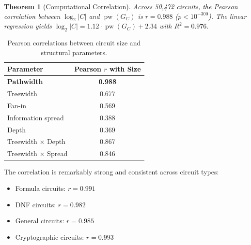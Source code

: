 \documentclass[11pt]{article}
\theoremstyle{plain}
\newtheorem{theorem}{Theorem}[section]
\theoremstyle{definition}
\newcommand{\pw}{\operatorname{pw}}
\begin{document}
\begin{theorem}[Computational Correlation]\label{thm:correlation}
Across 50{,}472 circuits, the Pearson correlation between $\log_2 |C|$ and $\pw(G_C)$ is $r = 0.988$ ($p < 10^{-300}$). The linear regression yields $\log_2 |C| = 1.12 \cdot \pw(G_C) + 2.34$ with $R^2 = 0.976$.
\end{theorem}

\begin{table}[htbp]
\centering
\caption{Pearson correlations between circuit size and structural parameters.}
\label{tab:correlations}
\begin{tabular}{@{}lc@{}}
\toprule
\textbf{Parameter} & \textbf{Pearson $r$ with Size} \\
\midrule
\textbf{Pathwidth} & \textbf{0.988} \\
Treewidth & 0.677 \\
Fan-in & 0.569 \\
Information spread & 0.388 \\
Depth & 0.369 \\
Treewidth $\times$ Depth & 0.867 \\
Treewidth $\times$ Spread & 0.846 \\
\bottomrule
\end{tabular}
\end{table}

The correlation is remarkably strong and consistent across circuit types:
\begin{itemize}
    \item Formula circuits: $r = 0.991$
    \item DNF circuits: $r = 0.982$
    \item General circuits: $r = 0.985$
    \item Cryptographic circuits: $r = 0.993$
\end{itemize}
\end{document}
